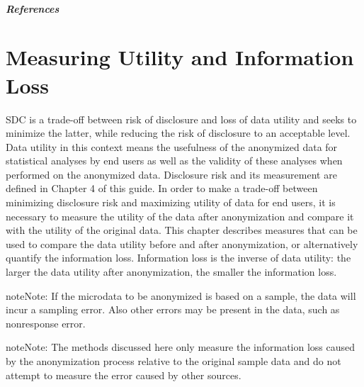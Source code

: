 \documentclass[letterpaper,10pt,english]{sphinxmanual}
\begin{document}
\paragraph{References}


\chapter{Measuring Utility and Information Loss}
\label{\detokenize{utility::doc}}\label{\detokenize{utility:measuring-utility-and-information-loss}}
SDC is a trade-off between risk of disclosure and loss of data utility
and seeks to minimize the latter, while reducing the risk of disclosure
to an acceptable level. Data utility in this context means the
usefulness of the anonymized data for statistical analyses by end users
as well as the validity of these analyses when performed on the
anonymized data. Disclosure risk and its measurement are defined in
Chapter 4 of this guide. In order to make a trade-off between minimizing
disclosure risk and maximizing utility of data for end users, it is
necessary to measure the utility of the data after anonymization and
compare it with the utility of the original data. This chapter describes
measures that can be used to compare the data utility before and after
anonymization, or alternatively quantify the information loss.
Information loss is the inverse of data utility: the larger the data
utility after anonymization, the smaller the information loss.

\begin{sphinxadmonition}{note}{Note:}
If the microdata to be anonymized is based on a sample, the data will incur
a sampling error. Also other errors may be present in the data, such as
nonresponse error.
\end{sphinxadmonition}

\begin{sphinxadmonition}{note}{Note:}
The methods discussed here only measure the
information loss caused by the anonymization process relative to the
original sample data and do not attempt to measure the error caused by
other sources.
\end{sphinxadmonition}
\end{document}
